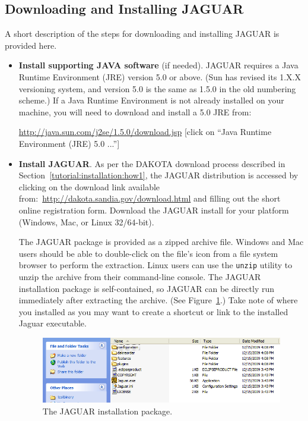 \subsection{Downloading and Installing JAGUAR}

A short description of the steps for downloading and installing JAGUAR
is provided here.

\begin{itemize}
\item \textbf{Install supporting JAVA software} (if needed).  JAGUAR
  requires a Java Runtime Environment (JRE) version 5.0 or above. (Sun
  has revised its 1.X.X versioning system, and version 5.0 is the same
  as 1.5.0 in the old numbering scheme.)  If a Java Runtime
  Environment is not already installed on your machine, you will need
  to download and install a 5.0 JRE from:

\url{http://java.sun.com/j2se/1.5.0/download.jsp} 
{\small [click on ``Java Runtime Environment (JRE) 5.0 ...'']}

\item \textbf{Install JAGUAR}.  As per the DAKOTA download process
  described in Section~\ref{tutorial:installation:how1}, the JAGUAR
  distribution is accessed by clicking on the download link available
  from:~\url{http://dakota.sandia.gov/download.html} and
  filling out the short online registration form.  Download the JAGUAR
  install for your platform (Windows, Mac, or Linux 32/64-bit).

The JAGUAR package is provided as a zipped archive file.  Windows and
Mac users should be able to double-click on the file's icon from a
file system browser to perform the extraction.  Linux users can use
the {\tt unzip} utility to unzip the archive from their command-line
console.  The JAGUAR installation package is self-contained, so JAGUAR
can be directly run immediately after extracting the archive. (See
Figure~\ref{fig:input:jag_package}.)  Take note of where you installed
as you may want to create a shortcut or link to the installed Jaguar
executable.
\begin{figure}
  \centering
  \includegraphics[scale=0.6]{images/jag_package}
  \caption{The JAGUAR installation package.}
  \label{fig:input:jag_package}
\end{figure}

\end{itemize}


